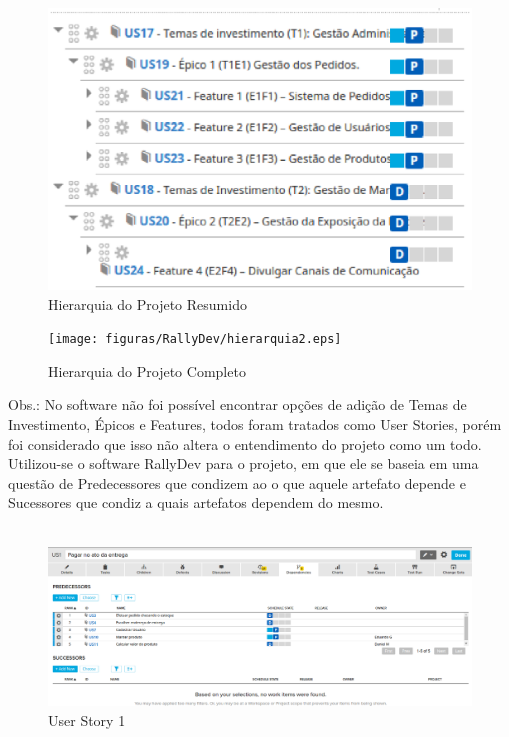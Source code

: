 \begin{figure}[h]
    \centering
    \label{fig01}
        \includegraphics[keepaspectratio=true,scale=0.5]{figuras/RallyDev/hierarquia1.eps}
    \caption{Hierarquia do Projeto Resumido}
\end{figure}

\begin{figure}[h]
    \centering
    \label{fig01}
        \texttt{[image: figuras/RallyDev/hierarquia2.eps]}
    \caption{Hierarquia do Projeto Completo}
\end{figure}

Obs.: No software não foi possível encontrar opções de adição de Temas de Investimento, Épicos e Features, todos foram tratados como User Stories, porém foi considerado que isso não altera o entendimento do projeto como um todo.\\
\tab Utilizou-se o software RallyDev para o projeto, em que ele se baseia em uma questão de Predecessores que condizem ao o que aquele artefato depende e Sucessores que condiz a quais artefatos dependem do mesmo.\\ \\

\begin{figure}[h]
    \centering
    \label{fig01}
        \includegraphics[keepaspectratio=true,scale=0.3]{figuras/RallyDev/US1.eps}
    \caption{User Story 1}
\end{figure}

